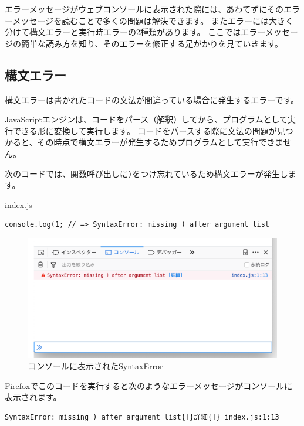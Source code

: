 エラーメッセージがウェブコンソールに表示された際には、あわてずにそのエラーメッセージを読むことで多くの問題は解決できます。
またエラーには大きく分けて構文エラーと実行時エラーの2種類があります。
ここではエラーメッセージの簡単な読み方を知り、そのエラーを修正する足がかりを見ていきます。

\hypertarget{syntax-error}{%
\subsection{構文エラー}\label{syntax-error}}

構文エラーは書かれたコードの文法が間違っている場合に発生するエラーです。

JavaScriptエンジンは、コードをパース（解釈）してから、プログラムとして実行できる形に変換して実行します。
コードをパースする際に文法の問題が見つかると、その時点で構文エラーが発生するためプログラムとして実行できません。

次のコードでは、関数呼び出しに\texttt{)}をつけ忘れているため構文エラーが発生します。

\begin{listtitle}
index.js
\end{listtitle}
\begin{lstlisting}
console.log(1; // => SyntaxError: missing ) after argument list
\end{lstlisting}
\listend

\begin{figure}
\centering
\includegraphics[width=140mm]{./fig/syntax-error.png}
\caption{コンソールに表示されたSyntaxError}
\end{figure}

Firefoxでこのコードを実行すると次のようなエラーメッセージがコンソールに表示されます。

\begin{lstlisting}
SyntaxError: missing ) after argument list{[}詳細{]} index.js:1:13
\end{lstlisting}

